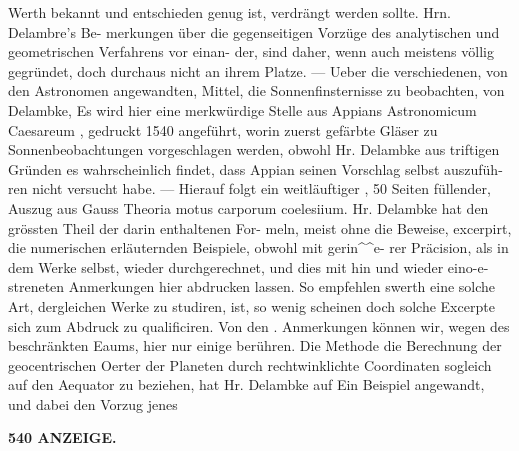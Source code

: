 \documentclass[12pt,a4paper]{article}
\begin{document}
Werth  bekannt  und  entschieden  genug  ist,  verdrängt  werden  sollte.     Hrn.  Delambre's  Be- merkungen über  die  gegenseitigen  Vorzüge   des  analytischen  und   geometrischen  Verfahrens   vor  einan- der, sind  daher,  wenn  auch  meistens  völlig  gegründet,  doch  durchaus  nicht  an  ihrem  Platze.  ---  Ueber die  verschiedenen,  von  den  Astronomen  angewandten,  Mittel,  die  Sonnenfinsternisse  zu  beobachten,  von Delambke,    Es  wird  hier  eine  merkwürdige  Stelle  aus  Appians  Astronomicum  Caesareum ,  gedruckt  1540 angeführt,    worin  zuerst  gefärbte   Gläser  zu   Sonnenbeobachtungen   vorgeschlagen  werden,   obwohl  Hr. Delambke  aus  triftigen  Gründen  es  wahrscheinlich  findet,  dass  Appian  seinen  Vorschlag  selbst  auszufüh- ren nicht  versucht  habe.  ---     Hierauf  folgt  ein  weitläuftiger ,   50  Seiten   füllender,    Auszug  aus   Gauss Theoria  motus  carporum  coelesiium.      Hr.  Delambke   hat  den  grössten  Theil   der  darin    enthaltenen  For- meln, meist  ohne  die  Beweise,  excerpirt,  die  numerischen  erläuternden  Beispiele,  obwohl  mit  gerin\textasciicircum{}\textasciicircum{}e- rer  Präcision,  als  in  dem  Werke  selbst,  wieder  durchgerechnet,    und   dies   mit  hin   und   wieder  eino-e- streneten  Anmerkungen  hier  abdrucken  lassen.     So  empfehlen swerth  eine  solche  Art,  dergleichen  Werke zu  studiren,    ist,    so  wenig  scheinen  doch  solche  Excerpte  sich  zum  Abdruck  zu  qualificiren.     Von  den . Anmerkungen  können  wir,    wegen  des  beschränkten  Eaums,    hier  nur  einige  berühren.     Die  Methode die  Berechnung  der  geocentrischen  Oerter  der  Planeten  durch  rechtwinklichte  Coordinaten  sogleich  auf den  Aequator  zu  beziehen,  hat  Hr.  Delambke  auf  Ein  Beispiel  angewandt,  und  dabei  den  Vorzug  jenes

\vspace{0.5em}


\noindent\textbf{540  ANZEIGE.}
\end{document}
